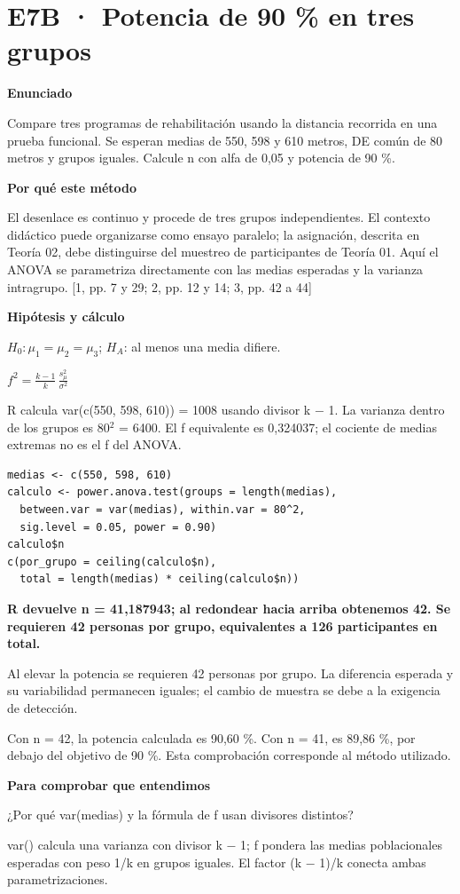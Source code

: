 \documentclass[10pt,a4paper]{article}
\newcommand{\etiqueta}[1]{\par{\bfseries\color{Blue}#1}\par}
\newcommand{\cajares}[1]{\par\colorbox{Pale}{\parbox{\dimexpr\linewidth-2\fboxsep}{\vspace{4pt}\textbf{\color{Navy}#1}\vspace{4pt}}}\par}
\begin{document}
\section*{E7B · Potencia de 90 \% en tres grupos}
\etiqueta{Enunciado}
Compare tres programas de rehabilitación usando la distancia recorrida en una prueba funcional. Se esperan medias de 550, 598 y 610 metros, DE común de 80 metros y grupos iguales. Calcule n con alfa de 0,05 y potencia de 90 \%.
\etiqueta{Por qué este método}
El desenlace es continuo y procede de tres grupos independientes. El contexto didáctico puede organizarse como ensayo paralelo; la asignación, descrita en Teoría 02, debe distinguirse del muestreo de participantes de Teoría 01. Aquí el ANOVA se parametriza directamente con las medias esperadas y la varianza intragrupo. [1, pp. 7 y 29; 2, pp. 12 y 14; 3, pp. 42 a 44]
\etiqueta{Hipótesis y cálculo}
$H_0:\mu_1=\mu_2=\mu_3$; $H_A$: al menos una media difiere.

$f^2=\frac{k-1}{k}\,\frac{s_{\mu}^2}{\sigma^2}$

R calcula var(c(550, 598, 610)) = 1008 usando divisor k \ensuremath{-} 1. La varianza dentro de los grupos es 80\ensuremath{^2} = 6400. El f equivalente es 0,324037; el cociente de medias extremas no es el f del ANOVA.
\begin{Verbatim}
medias <- c(550, 598, 610)
calculo <- power.anova.test(groups = length(medias),
  between.var = var(medias), within.var = 80^2,
  sig.level = 0.05, power = 0.90)
calculo$n
c(por_grupo = ceiling(calculo$n),
  total = length(medias) * ceiling(calculo$n))
\end{Verbatim}
\cajares{R devuelve n = 41,187943; al redondear hacia arriba obtenemos 42. Se requieren 42 personas por grupo, equivalentes a 126 participantes en total.}
Al elevar la potencia se requieren 42 personas por grupo. La diferencia esperada y su variabilidad permanecen iguales; el cambio de muestra se debe a la exigencia de detección.

{\small\color{Gray}Con n = 42, la potencia calculada es 90,60 \%. Con n = 41, es 89,86 \%, por debajo del objetivo de 90 \%. Esta comprobación corresponde al método utilizado.}
\etiqueta{Para comprobar que entendimos}
¿Por qué var(medias) y la fórmula de f usan divisores distintos?

{\small var() calcula una varianza con divisor k \ensuremath{-} 1; f pondera las medias poblacionales esperadas con peso 1/k en grupos iguales. El factor (k \ensuremath{-} 1)/k conecta ambas parametrizaciones.}
\clearpage
\end{document}
